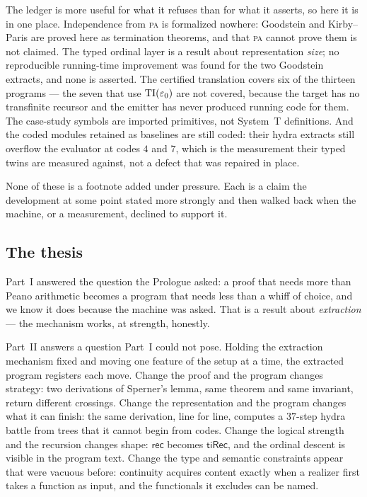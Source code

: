 The ledger is more useful for what it refuses than for what it asserts, so
here it is in one place. Independence from \textsc{pa} is formalized nowhere:
Goodstein and Kirby--Paris are proved here as termination theorems, and that
\textsc{pa} cannot prove them is not claimed. The typed ordinal layer is a
result about representation \emph{size}; no reproducible running-time
improvement was found for the two Goodstein extracts, and none is asserted.
The certified translation covers six of the thirteen programs --- the seven
that use $\mathrm{TI}(\varepsilon_0)$ are not covered, because the target has no
transfinite recursor and the emitter has never produced running code for
them. The case-study symbols are imported primitives, not System~T
definitions. And the coded modules retained as baselines are still coded:
their hydra extracts still overflow the evaluator at codes $4$ and $7$, which
is the measurement their typed twins are measured against, not a defect that
was repaired in place.

None of these is a footnote added under pressure. Each is a claim the
development at some point stated more strongly and then walked back when the
machine, or a measurement, declined to support it.

\subsection*{The thesis}

Part~I answered the question the Prologue asked: a proof that needs more than
Peano arithmetic becomes a program that needs less than a whiff of choice, and
we know it does because the machine was asked. That is a result about
\emph{extraction} --- the mechanism works, at strength, honestly.

Part~II answers a question Part~I could not pose. Holding the extraction
mechanism fixed and moving one feature of the setup at a time, the extracted
program registers each move. Change the proof and the program changes
strategy: two derivations of Sperner's lemma, same theorem and same invariant,
return different crossings. Change the representation and the program changes
what it can finish: the same derivation, line for line, computes a $37$-step
hydra battle from trees that it cannot begin from codes. Change the logical
strength and the recursion changes shape: $\mathsf{rec}$ becomes
$\mathsf{tiRec}$, and the ordinal descent is visible in the program text.
Change the type and semantic constraints appear that were vacuous before:
continuity acquires content exactly when a realizer first takes a function as
input, and the functionals it excludes can be named.

